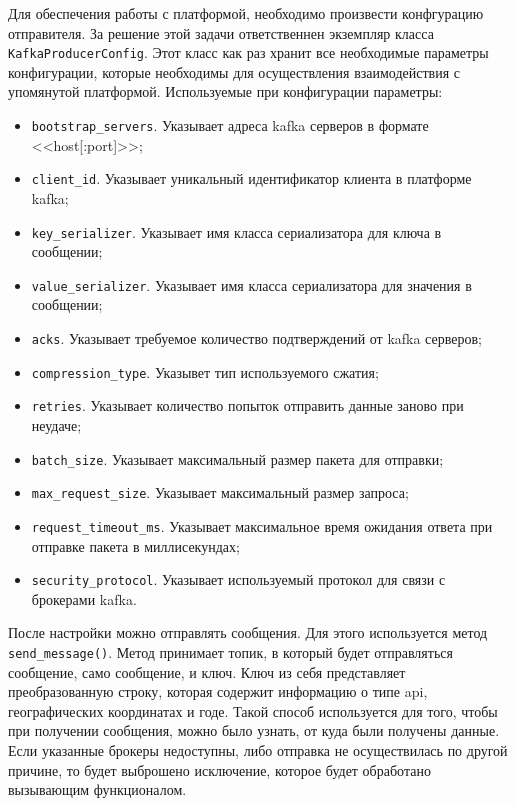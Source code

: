 Для обеспечения работы с платформой, необходимо произвести конфгурацию отправителя.
За решение этой задачи ответственнен экземпляр класса \texttt{KafkaProducerConfig}.
Этот класс как раз хранит все необходимые параметры конфигурации, которые необходимы для осуществления взаимодействия с упомянутой платформой.
Используемые при конфигурации параметры:
\begin{itemize}
    \item \texttt{bootstrap\_servers}. Указывает адреса kafka серверов в формате <<host[:port]>>;
    \item \texttt{client\_id}. Указывает уникальный идентификатор клиента в платформе kafka;
    \item \texttt{key\_serializer}. Указывает имя класса сериализатора для ключа в сообщении;
    \item \texttt{value\_serializer}. Указывает имя класса сериализатора для значения в сообщении;
    \item \texttt{acks}. Указывает требуемое количество подтверждений от kafka серверов;
    \item \texttt{compression\_type}. Указывет тип используемого сжатия;
    \item \texttt{retries}. Указывает количество попыток отправить данные заново при неудаче;
    \item \texttt{batch\_size}. Указывает максимальный размер пакета для отправки;
    \item \texttt{max\_request\_size}. Указывает максимальный размер запроса;
    \item \texttt{request\_timeout\_ms}. Указывает максимальное время ожидания ответа при отправке пакета в миллисекундах;
    \item \texttt{security\_protocol}. Указывает используемый протокол для связи с брокерами kafka.
\end{itemize}

После настройки можно отправлять сообщения.
Для этого используется метод \texttt{send\_message()}.
Метод принимает топик, в который будет отправляться сообщение, само сообщение, и ключ.
Ключ из себя представляет преобразованную строку, которая содержит информацию о типе api, географических координатах и годе.
Такой способ используется для того, чтобы при получении сообщения, можно было узнать, от куда были получены данные.
Если указанные брокеры недоступны, либо отправка не осуществилась по другой причине, то будет выброшено исключение, которое будет обработано вызывающим функционалом.






